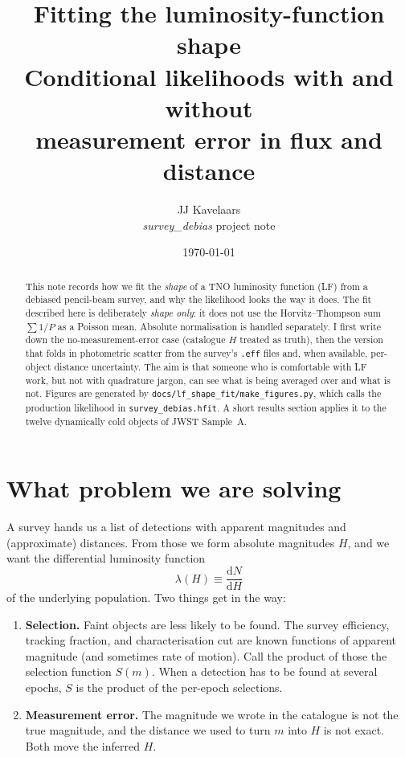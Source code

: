 \documentclass[11pt,a4paper]{article}
\title{Fitting the luminosity-function shape\\
\large Conditional likelihoods with and without\\
measurement error in flux and distance}
\author{JJ Kavelaars\\
\textit{survey\_debias} project note}
\date{\today}
\begin{document}
\maketitle

\begin{abstract}
This note records how we fit the \emph{shape} of a TNO luminosity function
(LF) from a debiased pencil-beam survey, and why the likelihood looks the way
it does.  The fit described here is deliberately \emph{shape only}: it does
not use the Horvitz--Thompson sum $\sum 1/P$ as a Poisson mean.  Absolute
normalisation is handled separately.  I first write down the no-measurement-error
case (catalogue $H$ treated as truth), then the version that folds in
photometric scatter from the survey's \texttt{.eff} files and, when available,
per-object distance uncertainty.  The aim is that someone who is comfortable
with LF work, but not with quadrature jargon, can see what is being averaged
over and what is not.  Figures are generated by
\texttt{docs/lf\_shape\_fit/make\_figures.py}, which calls the production
likelihood in \texttt{survey\_debias.hfit}.  A short results section applies
it to the twelve dynamically cold objects of JWST Sample~A.
\end{abstract}

\tableofcontents
\vspace{1em}

\section{What problem we are solving}
\label{sec:problem}

A survey hands us a list of detections with apparent magnitudes and
(approximate) distances.  From those we form absolute magnitudes $H$, and we
want the differential luminosity function
\begin{equation}
  \lambda(H) \equiv \frac{\mathrm{d}N}{\mathrm{d}H}
\end{equation}
of the underlying population.  Two things get in the way:

\begin{enumerate}
  \item \textbf{Selection.}  Faint objects are less likely to be found.  The
  survey efficiency, tracking fraction, and characterisation cut are known
  functions of apparent magnitude (and sometimes rate of motion).  Call the
  product of those the selection function $S(m)$.  When a detection has to be
  found at several epochs, $S$ is the product of the per-epoch selections.
  \item \textbf{Measurement error.}  The magnitude we wrote in the catalogue
  is not the true magnitude, and the distance we used to turn $m$ into $H$ is
  not exact.  Both move the inferred $H$.
\end{enumerate}
\end{document}
